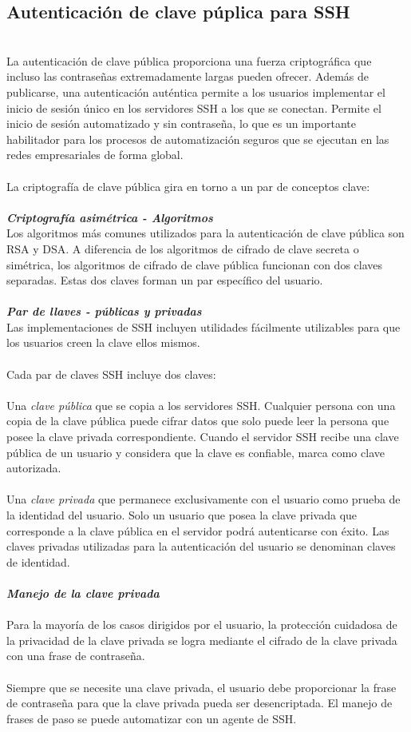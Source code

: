 \documentclass[12pt, a4paper]{article}
\begin{document}
	\subsection{Autenticación de clave púplica para SSH}
	\\La autenticación de clave pública proporciona una fuerza criptográfica que incluso las contraseñas extremadamente largas pueden ofrecer. Además de publicarse, una autenticación auténtica permite a los usuarios implementar el inicio de sesión único en los servidores SSH a los que se conectan. Permite el inicio de sesión automatizado y sin contraseña, lo que es un importante habilitador para los procesos de automatización seguros que se ejecutan en las redes empresariales de forma global.
	\\
	\\La criptografía de clave pública gira en torno a un par de conceptos clave:
	\\
	\\\textbf{\textit{Criptografía asimétrica - Algoritmos}}
	\\Los algoritmos más comunes utilizados para la autenticación de clave pública son RSA y DSA. A diferencia de los algoritmos de cifrado de clave secreta o simétrica, los algoritmos de cifrado de clave pública funcionan con dos claves separadas. Estas dos claves forman un par específico del usuario.
	\\
	\\\textbf{\textit{Par de llaves - públicas y privadas}}
	\\Las implementaciones de SSH incluyen utilidades fácilmente utilizables para que los usuarios creen la clave ellos mismos.
	\\
	\\Cada par de claves SSH incluye dos claves:
	\\
	\\Una \textit{clave pública} que se copia a los servidores SSH. Cualquier persona con una copia de la clave pública puede cifrar datos que solo puede leer la persona que posee la clave privada correspondiente. Cuando el servidor SSH recibe una clave pública de un usuario y considera que la clave es confiable, marca como clave autorizada.
	\\
	\\Una \textit{clave privada} que permanece exclusivamente con el usuario como prueba de la identidad del usuario. Solo un usuario que posea la clave privada que corresponde a la clave pública en el servidor podrá autenticarse con éxito. Las claves privadas utilizadas para la autenticación del usuario se denominan claves de identidad.
	\\
	\\\textbf{\textit{Manejo de la clave privada}}
	\\
	\\Para la mayoría de los casos dirigidos por el usuario, la protección cuidadosa de la privacidad de la clave privada se logra mediante el cifrado de la clave privada con una frase de contraseña.
	\\
	\\Siempre que se necesite una clave privada, el usuario debe proporcionar la frase de contraseña para que la clave privada pueda ser desencriptada. El manejo de frases de paso se puede automatizar con un agente de SSH.
\end{document}
